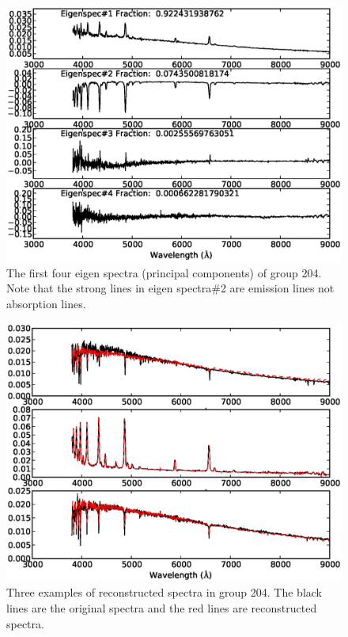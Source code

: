 \documentclass[manuscript]{aastex}
\begin{document}
\begin{figure}
   \centering
   \includegraphics[width=14cm, angle=0,clip]{f73.eps}
   \caption{The first four eigen spectra (principal components) of group 204.
    Note that the strong lines in eigen spectra\#2 are emission lines not absorption lines.
   }
   \label{Fig73}
\end{figure}

 \begin{figure}
   \centering
   \includegraphics[width=14cm, angle=0,clip]{f83.eps}
   \caption{Three examples of reconstructed spectra in group 204.
The black lines are the original spectra and the red lines are reconstructed spectra.
   }
   \label{Fig83}
\end{figure}
\end{document}
